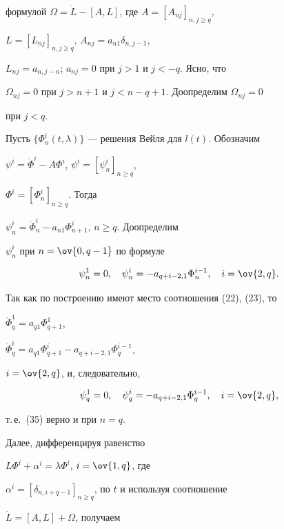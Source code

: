 формулой $\Omega=\Dot L-[A,L]$, где $A=[A_{nj}]_{n,j\ge q}$, 


$L=[L_{nj}]_{n,j\ge q}$, $A_{nj}=a_{n1}\delta_{n,j-1}$, 


$L_{nj}=a_{n,j-n}$; $a_{nj}=0$ при $j>1$ и $j<-q$. Ясно, что 


$\Omega_{nj}=0$ при $j>n+1$ и $j<n-q+1$. Доопределим $\Omega_{nj}=0$ 


при $j<q$. 


 


Пусть $\{\Phi^i_n(t,\lambda)\}$ --- решения Вейля для $l(t)$. Обозначим 


$\psi^i=\Dot\Phi^i-A\Phi^i$, $\psi^i=[\psi^i_n]_{n\ge q}$, 


$\Phi^i=[\Phi^i_n]_{n\ge q}$. Тогда 


$\psi^i_n=\Dot\Phi^i_n-a_{n1}\Phi^i_{n+1}$, $n\ge q$. Доопределим 


$\psi^i_n$ при $n=\ov{0,q-1}$ по формуле 


\begin{equation} 


\psi^1_n=0,\quad \psi^i_n=-a_{q+i-2,1}\Phi^{i-1}_n,\quad 


i=\ov{2,q}. 


\end{equation} 


Так как по построению имеют место соотношения (22), (23), то 


$\Dot\Phi^1_q=a_{q1}\Phi^1_{q+1}$, 


$\Dot\Phi^i_q=a_{q1}\Phi^i_{q+1}-a_{q+i-2,1}\Phi^{i-1}_q$, 


$i=\ov{2,q}$, и, следовательно, 


\begin{equation} 


\psi^1_q=0,\quad \psi^i_q=-a_{q+i-2,1}\Phi^{i-1}_q,\quad 


i=\ov{2,q}, 


\end{equation} 


т.\,е.~(35) верно и при $n=q$. 


 


Далее, дифференцируя равенство 


$L\Phi^i+\alpha^i=\lambda\Phi^i$, $i=\ov{1,q}$, где 


$\alpha^i=[\delta_{n,i+q-1}]_{n\ge q}$, по $t$ и используя соотношение 


$\Dot L=[A,L]+\Omega$, получаем 


